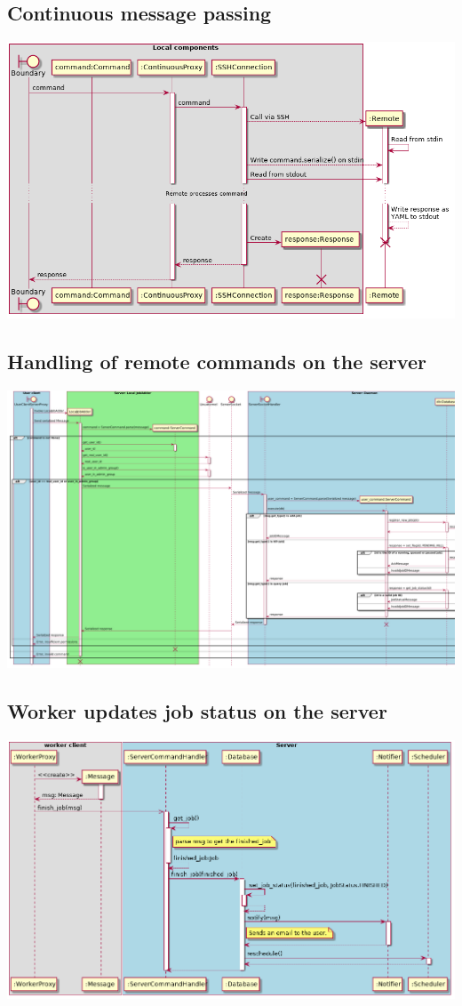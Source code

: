         \subsection{Continuous message passing}
            \includegraphics[width=\linewidth]{sequence/proxy-continuous.png}
        \subsection{Handling of remote commands on the server}
            \includegraphics[width=\linewidth]{sequence/server-local-request.png}
        \subsection{Worker updates job status on the server}
            \includegraphics[width=\linewidth]{sequence/finish-sd.png}
